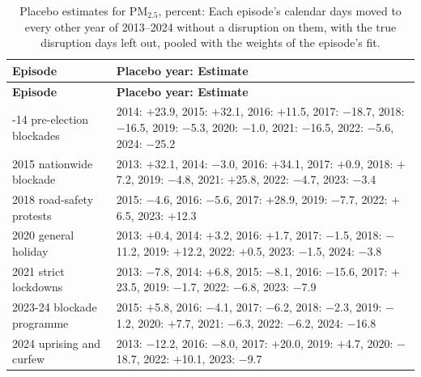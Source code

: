 \begingroup\scriptsize
\begin{longtable}{L{3.4cm} L{12.6cm}}
\caption{Placebo estimates for PM$_{2.5}$, percent: Each episode's calendar days moved to every other year of 2013--2024 without a disruption on them, with the true disruption days left out, pooled with the weights of the episode's fit.}\label{tab:s-long-placebos}\\
\toprule
\textbf{Episode} & \textbf{Placebo year: Estimate} \\
\midrule\endfirsthead
\toprule
\textbf{Episode} & \textbf{Placebo year: Estimate} \\
\midrule\endhead
\bottomrule{}-14 pre-election blockades & 2014: $+$23.9, 2015: $+$32.1, 2016: $+$11.5, 2017: $-$18.7, 2018: $-$16.5, 2019: $-$5.3, 2020: $-$1.0, 2021: $-$16.5, 2022: $-$5.6, 2024: $-$25.2 \\
2015 nationwide blockade & 2013: $+$32.1, 2014: $-$3.0, 2016: $+$34.1, 2017: $+$0.9, 2018: $+$7.2, 2019: $-$4.8, 2021: $+$25.8, 2022: $-$4.7, 2023: $-$3.4 \\
2018 road-safety protests & 2015: $-$4.6, 2016: $-$5.6, 2017: $+$28.9, 2019: $-$7.7, 2022: $+$6.5, 2023: $+$12.3 \\
2020 general holiday & 2013: $+$0.4, 2014: $+$3.2, 2016: $+$1.7, 2017: $-$1.5, 2018: $-$11.2, 2019: $+$12.2, 2022: $+$0.5, 2023: $-$1.5, 2024: $-$3.8 \\
2021 strict lockdowns & 2013: $-$7.8, 2014: $+$6.8, 2015: $-$8.1, 2016: $-$15.6, 2017: $+$23.5, 2019: $-$1.7, 2022: $-$6.8, 2023: $-$7.9 \\
2023-24 blockade programme & 2015: $+$5.8, 2016: $-$4.1, 2017: $-$6.2, 2018: $-$2.3, 2019: $-$1.2, 2020: $+$7.7, 2021: $-$6.3, 2022: $-$6.2, 2024: $-$16.8 \\
2024 uprising and curfew & 2013: $-$12.2, 2016: $-$8.0, 2017: $+$20.0, 2019: $+$4.7, 2020: $-$18.7, 2022: $+$10.1, 2023: $-$9.7 \\
\end{longtable}
\endgroup
